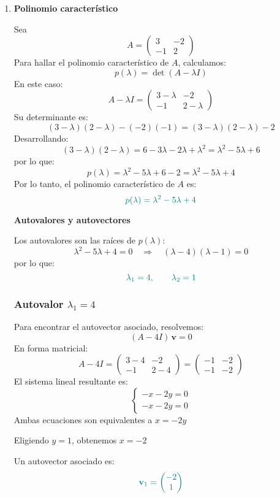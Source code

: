 \documentclass{article}
\begin{document}
\begin{enumerate}[label=\textbf{\alph*)}]
\item \textbf{Polinomio característico}

Sea
\[
A =
\begin{pmatrix}
3 & -2\\
-1 & 2
\end{pmatrix}
\]
Para hallar el polinomio característico de \(A\), calculamos:
\[
p(\lambda) = \det(A - \lambda I)
\]
En este caso:
\[
A - \lambda I =
\begin{pmatrix}
3 - \lambda & -2\\
-1 & 2 - \lambda
\end{pmatrix}
\]
Su determinante es:
\[
(3 - \lambda)(2 - \lambda) - (-2)(-1)
= (3-\lambda)(2-\lambda) - 2
\]
Desarrollando:
\[
(3-\lambda)(2-\lambda)
= 6 - 3\lambda - 2\lambda + \lambda^2
= \lambda^2 - 5\lambda + 6
\]
por lo que:
\[
p(\lambda) = \lambda^2 - 5\lambda + 6 - 2 = \lambda^2 - 5\lambda + 4
\]
Por lo tanto, el polinomio característico de \(A\) es:
\[
\color{teal}
p(\lambda) = \lambda^2 - 5\lambda + 4
\]

\textbf{Autovalores y autovectores}

Los autovalores son las raíces de \(p(\lambda)\):
\[
\lambda^2 - 5\lambda + 4 = 0
\quad\Longrightarrow\quad
(\lambda - 4)(\lambda - 1) = 0
\]
por lo que:
\[
\color{teal}
\lambda_1 = 4,
\qquad
\lambda_2 = 1
\]

\subsubsection*{Autovalor \(\lambda_1 = 4\)}

Para encontrar el autovector asociado, resolvemos:
\[
(A - 4I)\,\mathbf{v} = 0
\]
En forma matricial:
\[
A - 4I =
\begin{pmatrix}
3 - 4 & -2\\
-1 & 2 - 4
\end{pmatrix}
=
\begin{pmatrix}
-1 & -2\\
-1 & -2
\end{pmatrix}
\]
El sistema lineal resultante es:
\[
\begin{cases}
-x - 2y = 0\\
-x - 2y = 0
\end{cases}
\]
Ambas ecuaciones son equivalentes a \(x = -2y\)

Eligiendo \(y = 1\), obtenemos \(x = -2\)

Un autovector asociado es:
\[
\color{teal}
\mathbf{v}_1 =
\begin{pmatrix}
-2\\
1
\end{pmatrix}
\]


\end{enumerate}
\end{document}
